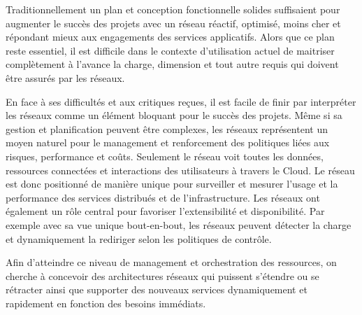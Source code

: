 
Traditionnellement un plan et conception fonctionnelle solides suffisaient pour augmenter le succès des projets avec un réseau réactif, optimisé, moins cher et répondant mieux aux engagements des services applicatifs. Alors que ce plan reste essentiel, il est difficile dans le contexte d'utilisation actuel de maitriser complètement  à l'avance la charge, dimension et tout autre requis qui doivent être assurés par les réseaux.

En face à ses difficultés et aux critiques reçues, il est facile  de finir par interpréter les réseaux comme un élément bloquant pour le succès des projets. Même si sa gestion et planification peuvent être complexes, les réseaux représentent un moyen naturel pour le management et renforcement des politiques liées aux risques, performance et coûts. Seulement le réseau voit toutes les données, ressources connectées et interactions des utilisateurs à travers le Cloud. Le réseau est donc positionné de manière unique pour surveiller et mesurer l'usage et la performance des services distribués et de l'infrastructure. Les réseaux ont également un rôle central pour favoriser l'extensibilité et disponibilité. Par exemple avec sa vue unique bout-en-bout, les réseaux peuvent détecter la charge et dynamiquement la rediriger selon les politiques de contrôle.

Afin d'atteindre ce niveau de management et orchestration des ressources, on cherche  à concevoir des architectures réseaux qui puissent s'étendre ou se rétracter ainsi que supporter des nouveaux services dynamiquement et rapidement  en fonction des besoins immédiats. \cite{ibmPlanningVirtCCchap4} \cite{cloudAutomation} \cite{hpCloudEffectsOnNetworkIntro}


